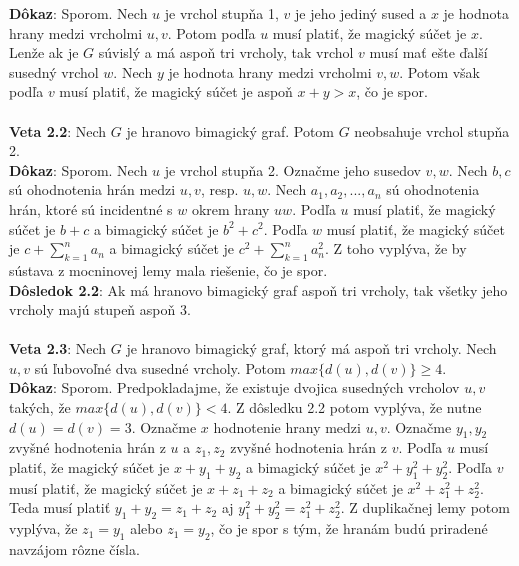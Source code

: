 \documentclass[12pt]{article}
\begin{document}
\textbf{Dôkaz}: Sporom. Nech $u$ je vrchol stupňa 1, $v$ je jeho jediný sused a $x$ je hodnota hrany medzi vrcholmi $u,v$. Potom podľa $u$ musí platiť, že magický súčet je $x$. Lenže ak je $G$ súvislý a má aspoň tri vrcholy, tak vrchol $v$ musí mať ešte ďalší susedný vrchol $w$. Nech $y$ je hodnota hrany medzi vrcholmi $v,w$. Potom však podľa $v$ musí platiť, že magický súčet je aspoň $x + y > x$, čo je spor. \\\\ 

\textbf{Veta 2.2}: Nech $G$ je hranovo bimagický graf. Potom $G$ neobsahuje vrchol stupňa 2. \\

\textbf{Dôkaz}: Sporom. Nech $u$ je vrchol stupňa 2. Označme jeho susedov $v,w$. Nech $b,c$ sú ohodnotenia hrán medzi $u,v$, resp. $u,w$. Nech $a_1, a_2, ... , a_n$ sú ohodnotenia hrán, ktoré sú incidentné s $w$ okrem hrany $uw$. Podľa $u$ musí platiť, že magický súčet je $b+c$ a bimagický súčet je $b^2 + c^2$. Podľa $w$ musí platiť, že magický súčet je $c + \sum_{k=1}^{n} a_n$ a bimagický súčet je $c^2 + \sum_{k=1}^{n} a^2_n$. Z toho vyplýva, že by sústava z mocninovej lemy mala riešenie, čo je spor. \\

\textbf{Dôsledok 2.2}: Ak má hranovo bimagický graf aspoň tri vrcholy, tak všetky jeho vrcholy majú stupeň aspoň 3. \\\\

\textbf{Veta 2.3}: Nech $G$ je hranovo bimagický graf, ktorý má aspoň tri vrcholy. Nech $u,v$ sú ľubovoľné dva susedné vrcholy. Potom $max \{d(u), d(v)\} \geq 4$. \\

\textbf{Dôkaz}: Sporom. Predpokladajme, že existuje dvojica susedných vrcholov $u,v$ takých, že $max \{d(u), d(v)\} < 4$. Z dôsledku 2.2 potom vyplýva, že nutne $d(u) = d(v) = 3$. Označme $x$ hodnotenie hrany medzi $u,v$. Označme $y_1, y_2$ zvyšné hodnotenia hrán z $u$ a $z_1, z_2$ zvyšné hodnotenia hrán z $v$. Podľa $u$ musí platiť, že magický súčet je $x + y_1 + y_2$ a bimagický súčet je $x^2 + y^2_1 + y^2_2$. Podľa $v$ musí platiť, že magický súčet je $x + z_1 + z_2$ a bimagický súčet je $x^2 + z^2_1 + z^2_2$. Teda musí platiť $y_1 + y_2 = z_1 + z_2$ aj $y^2_1 + y^2_2 = z^2_1 + z^2_2$. Z duplikačnej lemy potom vyplýva, že $z_1 = y_1$ alebo $z_1 = y_2$, čo je spor s tým, že hranám budú priradené navzájom rôzne čísla.  \\
\end{document}
